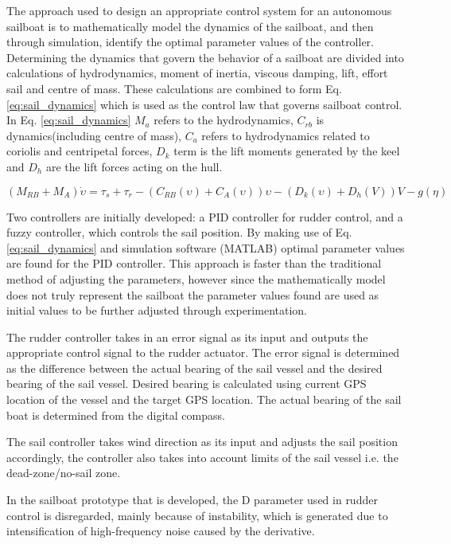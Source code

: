 The approach used to design an appropriate control system for an autonomous sailboat is to mathematically model the dynamics of the sailboat, and then through simulation, identify 
the optimal parameter values of the controller. Determining the dynamics that govern the behavior of a sailboat are divided into calculations of hydrodynamics, moment of inertia, 
viscous damping, lift, effort sail and centre of mass. These calculations are combined to form Eq. \ref{eq:sail_dynamics} which is used as the control law that governs sailboat control. 
In Eq. \ref{eq:sail_dynamics} $M_{a}$ refers to the hydrodynamics, $C_{rb}$ is dynamics(including centre of mass), $C_{a}$ refers to hydrodynamics related to coriolis and centripetal forces, 
$D_{k}$ term is the lift moments generated by the keel and $D_{h}$ are the lift forces acting on the hull.

\begin{equation}
    ( M_{RB} + M_{A} ) \dot{\upsilon} = \tau_{s} + \tau_{r} - (C_{RB}(\upsilon) + C_{A}(\upsilon))\upsilon  - (D_{k}(\upsilon) + D_{h}(V))V - g(\eta)
    \label{eq:sail_dynamics}
\end{equation}

Two controllers are initially developed: a PID controller for rudder control, and a fuzzy controller, which controls the sail position. By making use of Eq. \ref{eq:sail_dynamics} and simulation 
software (MATLAB) optimal parameter values are found for the PID controller. This approach is faster than the traditional method of adjusting the parameters, however since the 
mathematically model does not truly represent the sailboat the parameter values found are used as initial values to be further adjusted through experimentation.

The rudder controller takes in an error signal as its input and outputs the appropriate control signal to the rudder actuator. The error signal is determined as the difference 
between the actual bearing of the sail vessel and the desired bearing of the sail vessel. Desired bearing is calculated using current GPS location of the vessel and the target 
GPS location. The actual bearing of the sail boat is determined from the digital compass. 

The sail controller takes wind direction as its input and adjusts the sail position accordingly, the controller also takes into account limits of the sail vessel i.e. the dead-zone/no-sail zone.

In the sailboat prototype that is developed, the D parameter used in rudder control is disregarded, mainly because of instability, which is generated due to intensification 
of high-frequency noise caused by the derivative. 

